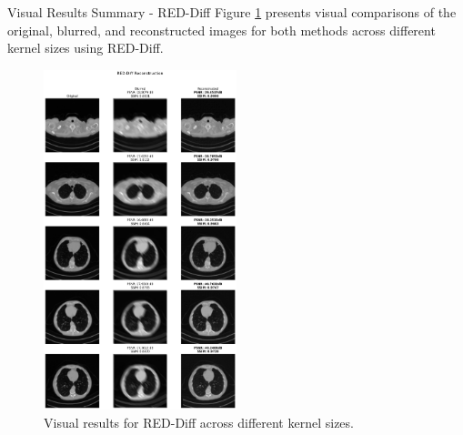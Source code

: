 \begin{frame}{Visual Results Summary - RED-Diff}
    Figure \ref{fig:visual_results_red_diff} presents visual comparisons of the original, blurred, and reconstructed images for both methods across different kernel sizes using RED-Diff.
    \begin{figure}
        \centering
        \includegraphics[width=0.5\textwidth]{media/deblurring_reddiff.png}
        \caption{Visual results for RED-Diff across different kernel sizes.}
        \label{fig:visual_results_red_diff}
    \end{figure}
\end{frame}